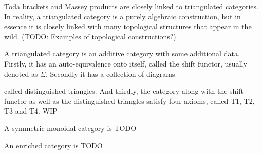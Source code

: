 Toda brackets and Massey products are closely linked to triangulated categories. In reality, a triangulated category is a purely algebraic construction, but in essence it is closely linked with many topological structures that appear in the wild. (TODO: Examples of topological constructions?)

A triangulated category is an additive category with some additional data. Firstly, it has an auto-equivalence onto itself, called the shift functor, usually denoted as \( \Sigma \). Secondly it has a collection of diagrams
\begin{center}
\end{center}
called distinguished triangles. And thirdly, the category along with the shift functor as well as the distinguished triangles satisfy four axioms, called T1, T2, T3 and T4. WIP

A symmetric monoidal category is TODO

An enriched category is TODO
